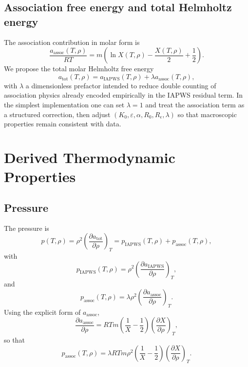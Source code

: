 \documentclass[12pt]{article}
\begin{document}
\subsection{Association free energy and total Helmholtz energy}

The association contribution in molar form is
\begin{equation}
  \frac{a_{\mathrm{assoc}}(T,\rho)}{RT}=m\left(\ln X(T,\rho)-\frac{X(T,\rho)}{2}+\frac{1}{2}\right).
\end{equation}
We propose the total molar Helmholtz free energy
\begin{equation}
  a_{\mathrm{tot}}(T,\rho)=a_{\mathrm{IAPWS}}(T,\rho)+\lambda a_{\mathrm{assoc}}(T,\rho),
\end{equation}
with $\lambda$ a dimensionless prefactor intended to reduce double counting of association physics already encoded empirically in the IAPWS residual term. In the simplest implementation one can set $\lambda=1$ and treat the association term as a structured correction, then adjust $(K_0,\varepsilon,\alpha,R_0,R_\epsilon,\lambda)$ so that macroscopic properties remain consistent with data.

\section{Derived Thermodynamic Properties}

\subsection{Pressure}

The pressure is
\begin{equation}
  p(T,\rho)=\rho^2\left(\frac{\partial a_{\mathrm{tot}}}{\partial\rho}\right)_T=p_{\mathrm{IAPWS}}(T,\rho)+p_{\mathrm{assoc}}(T,\rho),
\end{equation}
with
\begin{equation}
  p_{\mathrm{IAPWS}}(T,\rho)=\rho^2\left(\frac{\partial a_{\mathrm{IAPWS}}}{\partial\rho}\right)_T,
\end{equation}
and
\begin{equation}
  p_{\mathrm{assoc}}(T,\rho)=\lambda\rho^2\left(\frac{\partial a_{\mathrm{assoc}}}{\partial\rho}\right)_T.
\end{equation}
Using the explicit form of $a_{\mathrm{assoc}}$,
\begin{equation}
  \frac{\partial a_{\mathrm{assoc}}}{\partial\rho}=RTm\left(\frac{1}{X}-\frac{1}{2}\right)\left(\frac{\partial X}{\partial\rho}\right)_T,
\end{equation}
so that
\begin{equation}
  p_{\mathrm{assoc}}(T,\rho)=\lambda RTm\rho^2\left(\frac{1}{X}-\frac{1}{2}\right)\left(\frac{\partial X}{\partial\rho}\right)_T.
\end{equation}
\end{document}
